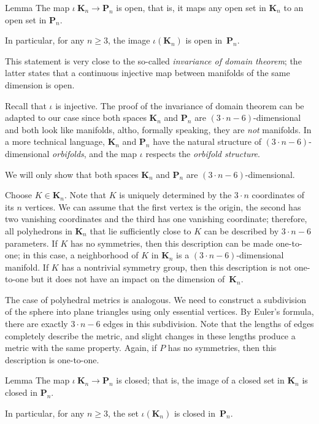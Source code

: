\begin{thm}{Lemma}
The map $\iota\:\mathbf{K}_n\to\mathbf{P}_n$ is open,
that is, it maps any open set in $\mathbf{K}_n$ to an open set in $\mathbf{P}_n$.

In particular, for any $n\ge 3$, the image $\iota(\mathbf{K}_n)$ is open in~$\mathbf{P}_n$.
\end{thm}

This statement is very close to the so-called \textit{invariance of domain theorem};
the latter states that a continuous injective map between manifolds of the same dimension is open.

Recall that $\iota$ is injective.
The proof of the invariance of domain theorem can be adapted to our case since both spaces $\mathbf{K}_n$ and $\mathbf{P}_n$ are $(3\cdot n-6)$-dimensional and both look like manifolds, altho, formally speaking, they are \textit{not} manifolds.
In a more technical language, $\mathbf{K}_n$ and $\mathbf{P}_n$ have the natural structure of $(3\cdot n-6)$-dimensional \textit{orbifolds},
and the map $\iota$ respects the \textit{orbifold structure}.

We will only show that both spaces $\mathbf{K}_n$ and $\mathbf{P}_n$ are $(3\cdot n-6)$-dimensional.

Choose  $K\in\mathbf{K}_n$.
Note that $K$ is uniquely determined by the $3\cdot n$ coordinates of its $n$ vertices.
We can assume that the first vertex is the origin, the second has two vanishing coordinates and the third has one vanishing coordinate; therefore, all polyhedrons in $\mathbf{K}_n$ that lie sufficiently close to $K$ can be described by $3\cdot n-6$ parameters.
If $K$ has no symmetries, then this description can be made one-to-one;
in this case, a neighborhood of $K$ in $\mathbf{K}_n$ is a $(3\cdot n-6)$-dimensional manifold.
If $K$ has a nontrivial symmetry group, then this description is not one-to-one but it does not have an impact on the dimension of~$\mathbf{K}_n$.

The case of polyhedral metrics is analogous.
We need to construct a subdivision of the sphere into plane triangles using only essential vertices.
By Euler's formula, there are exactly $3\cdot n-6$ edges in this subdivision.
Note that the lengths of edges completely describe the metric, and slight changes in these lengths produce a metric with the same property.
Again, if $P$ has no symmetries, then this description is one-to-one.

\begin{thm}{Lemma}
The map $\iota\:\mathbf{K}_n\to\mathbf{P}_n$ is closed;
that is, the image of a closed set in $\mathbf{K}_n$ is closed in $\mathbf{P}_n$.

In particular, for any $n\ge 3$, the set $\iota(\mathbf{K}_n)$ is closed in~$\mathbf{P}_n$.
\end{thm}

